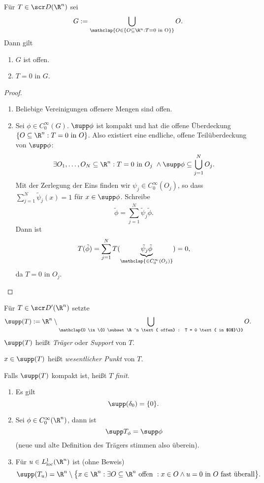 \begin{st} \label{5.22}
	Für $T \in \scr D(\R^n)$ sei
	\[
		G := \bigcup_{\mathclap{O \in \{O \subset \R^n : T = 0 \text{ in O}\}}} O.
	\]
	Dann gilt
	\begin{enumerate}[1)]
		\item
			$G$ ist offen.
		\item
			$T = 0$ in $G$.
	\end{enumerate}
	\begin{proof}
		\begin{enumerate}[1)]
			\item
				Beliebige Vereinigungen offenere Mengen sind offen.
			\item
				Sei $\phi \in C_0^\infty (G)$.
				$\supp \phi$ ist kompakt und hat die offene Überdeckung $\{ O \subset \R^n : T = 0 \text{ in $O$}\}$.
				Also existiert eine endliche, offene Teilüberdeckung von $\supp \phi$:
				\[
					\exists O_1, \dotsc, O_N \subset \R^n :
					T = 0 \text{ in $O_j$ }
						\land \supp \phi \subset \bigcup_{j=1}^N O_j.
				\]
				Mit der Zerlegung der Eins finden wir $\psi_j \in C_0^\infty (O_j)$, so dass $\sum_{j=1}^N \tilde \psi_j (x) = 1$ für $x \in \supp \phi$.
				Schreibe
				\[
					\tilde \phi = \sum_{j=1}^N \tilde \psi_j \tilde \phi.
				\]
				Dann ist
				\[
					T(\tilde \phi) 
					= \sum_{j=1}^N T(\underbrace{\tilde \psi_j \tilde \phi}_{\mathclap{\in C_0^\infty(O_j)}}) 
					= 0,
				\]
				da $T = 0$ in $O_j$.
		\end{enumerate}
	\end{proof}
\end{st}

\begin{df} \label{5.23}
	Für $T \in \scr D'(\R^n)$ setzte
	\[
		\supp(T) := \R^n \setminus \bigcup_{\mathclap{O \in \{O \subset \R^n \text{ offen} : T = 0 \text{ in $O$}\}}} O.
	\]
	$\supp (T)$ heißt \emph{Träger} oder \emph{Support} von $T$.

	$x \in \supp(T)$ heißt \emph{wesentlicher Punkt} von $T$.

	Falls $\supp(T)$ kompakt ist, heißt $T$ \emph{finit}.
\end{df}

\begin{ex} \label{5.24}
	\begin{enumerate}[1)]
		\item
			Es gilt
			\[
				\supp (\delta_0) = \{ 0 \}.
			\]
		\item
			Sei $\phi \in C_0^\infty(\R^n)$, dann ist
			\[
				\supp T_\phi = \supp \phi
			\]
			(neue und alte Definition des Trägers stimmen also überein).
		\item
			Für $u \in L_{\text{loc}}^1(\R^n)$ ist (ohne Beweis)
			\[
				\supp(T_u) = \R^n \setminus \big\{x \in \R^n : \exists O \subset \R^n \text{ offen } : x \in O \land u = 0 \text{ in $O$ fast überall} \big\}.
			\]
	\end{enumerate}
\end{ex}

